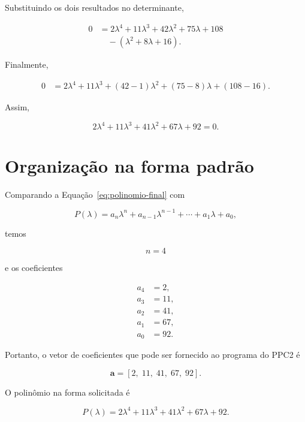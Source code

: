 \documentclass[12pt,a4paper]{article}
\begin{document}
Substituindo os dois resultados no determinante,

\begin{align}
0
&=
2\lambda^4
+11\lambda^3
+42\lambda^2
+75\lambda
+108\\
&\quad
-\left(\lambda^2+8\lambda+16\right).
\end{align}

Finalmente,

\begin{align}
0
&=
2\lambda^4
+11\lambda^3
+(42-1)\lambda^2
+(75-8)\lambda
+(108-16).
\end{align}

Assim,

\begin{equation}
\boxed{
2\lambda^4
+11\lambda^3
+41\lambda^2
+67\lambda
+92
=0
}.
\label{eq:polinomio-final}
\end{equation}

\section{Organização na forma padrão}

Comparando a Equação~\eqref{eq:polinomio-final} com

\begin{equation}
P(\lambda)
=
a_n\lambda^n
+a_{n-1}\lambda^{n-1}
+\cdots
+a_1\lambda
+a_0,
\end{equation}

temos

\begin{equation}
n=4
\end{equation}

e os coeficientes

\begin{align}
a_4 &= 2,\\
a_3 &= 11,\\
a_2 &= 41,\\
a_1 &= 67,\\
a_0 &= 92.
\end{align}

Portanto, o vetor de coeficientes que pode ser fornecido ao programa do
PPC2 é

\begin{equation}
\boxed{
\mathbf{a}
=
[2,\;11,\;41,\;67,\;92]
}.
\end{equation}

O polinômio na forma solicitada é

\begin{equation}
\boxed{
P(\lambda)
=
2\lambda^4
+11\lambda^3
+41\lambda^2
+67\lambda
+92
}.
\end{equation}
\end{document}
